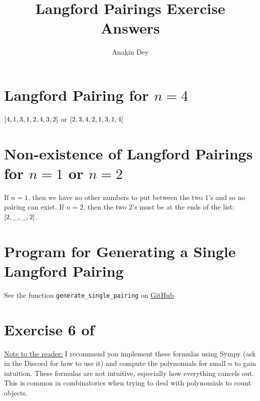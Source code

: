 \documentclass[letterpaper]{article}
\title{Langford Pairings Exercise Answers}
\author{Anakin Dey}
\begin{document}
\maketitle

\section*{Langford Pairing for $n = 4$}

$\bqty{4, 1, 3, 1, 2, 4, 3, 2}$ or $\bqty{2, 3, 4, 2, 1, 3, 1, 4}$

\section*{Non-existence of Langford Pairings for $n = 1$ or $n = 2$}

If $n = 1$, then we have no other numbers to put between the two $1$'s and so no pairing can exist.
If $n = 2$, then the two $2$'s must be at the ends of the list: $\bqty{2, \_, \_, 2}$.

\section*{Program for Generating a Single Langford Pairing}

See the function \texttt{generate\_single\_pairing} on \href{}{GitHub}

\section*{Exercise 6 of \cite[Chapter~7]{TAOCP4A}}

\underline{Note to the reader:} I recommend you implement these formulas using Sympy (ask in the Discord for how to use it) and compute the polynomials for small $n$ to gain intuition.
These formulas are not intuitive, especially how everything cancels out.
This is common in combinatorics when trying to deal with polynomials to count objects.
\end{document}
